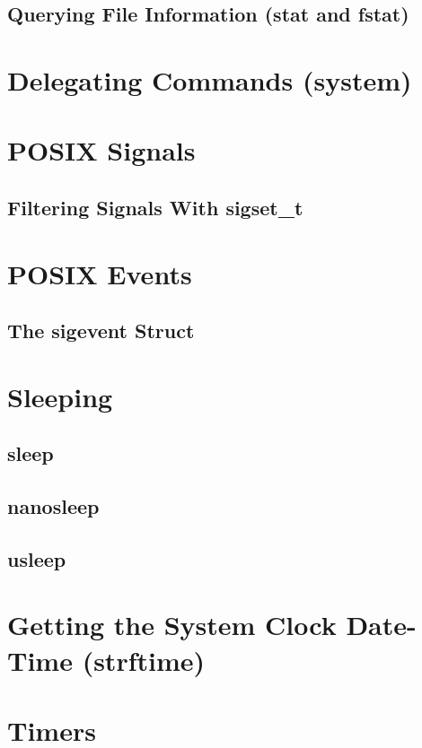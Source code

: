 \documentclass{article}
\begin{document}
\subsection{Querying File Information (stat and fstat)}

\section{Delegating Commands (system)}

\section{POSIX Signals}

\subsection{Filtering Signals With sigset\_t}

\section{POSIX Events}

\subsection{The sigevent Struct}

\section{Sleeping}

\subsection{sleep}

\subsection{nanosleep}

\subsection{usleep}

\section{Getting the System Clock Date-Time (strftime)}

\section{Timers}
\end{document}
